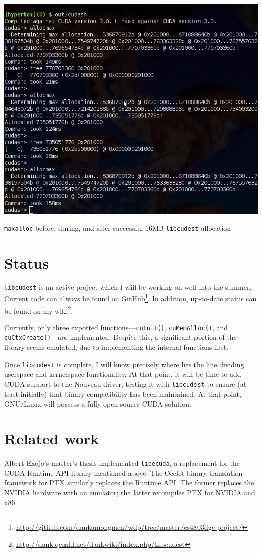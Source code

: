 \documentclass[letterpaper,10pt]{article}
\makeatletter
\newenvironment{figurehere}
{\def\@captype{figure}}
{}
\makeatother
\begin{document}
\begin{multicols}{2}
\vspace{3 mm}
\begin{figurehere}
\centering
\includegraphics[width=\columnwidth]{texobjs/libcudestalloc.png}
\caption{\texttt{maxalloc} before, during, and after successful 16MB \texttt{libcudest} allocation}
\end{figurehere}
\section{Status}
\texttt{libcudest} is an active project which I will be working on well into the
summer. Current code can always be found on GitHub\footnote{\url{http://github.com/dankamongmen/wdp/tree/master/cs4803dgc-project/}}.
In addition, up-to-date status can be found on my wiki\footnote{\url{http://dank.qemfd.net/dankwiki/index.php/Libcudest}}.

Currently, only three exported functions---\texttt{cuInit()}, \texttt{cuMemAlloc()}, and
\texttt{cuCtxCreate()}---are implemented. Despite this, a significant portion of
the library seems emulated, due to implementing the internal functions first.

Once \texttt{libcudest} is complete, I will know precisely where lies the line
dividing userspace and kernelspace functionality. At that point, it will be time
to add CUDA support to the Nouveau driver, testing it with \texttt{libcudest} to
ensure (at least initially) that binary compatibility has been maintained. At
that point, GNU/Linux will possess a fully open source CUDA solution.
\section{Related work}
Albert Exojo's master's thesis implemented \texttt{libecuda}\cite{exojo}, a replacement for
the CUDA Runtime API library mentioned above. The Ocelot\cite{ocelot} binary translation
framework for PTX similarly replaces the Runtime API. The former replaces the NVIDIA
hardware with an emulator; the latter recompiles PTX for NVIDIA and x86.


\end{multicols}
\end{document}
